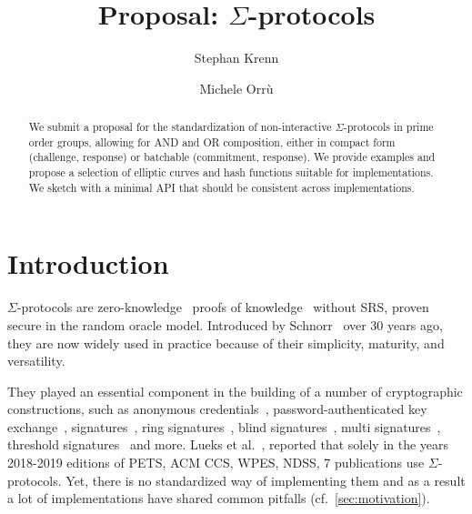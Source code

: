 \documentclass[runningheads]{llncs}
\newif\ifanonymous
\begin{document}
\title{Proposal: $\Sigma$-protocols}
%

\ifanonymous
\author{}
\institute{}
\else
\author{Stephan Krenn \and
        Michele Orr\`u}

\fi
%
\maketitle              %
%
\begin{abstract}
  We submit a proposal for the standardization of non-interactive $\Sigma$-protocols in prime order groups, allowing for AND and OR composition, either in compact form (challenge, response) or batchable (commitment, response). We provide examples and propose a selection of elliptic curves and hash functions suitable for implementations. We sketch with a minimal API that should be consistent across implementations.

\end{abstract}

\section{Introduction}
$\Sigma$-protocols are zero-knowledge~\cite{GolMicRac89} proofs of knowledge~\cite{C:BelGol92} without SRS, proven secure in the random oracle model.
Introduced by Schnorr~\cite{JC:Schnorr91} over 30 years ago, they are now widely used  in practice because of their simplicity, maturity, and versatility.

They played an essential component in the building of a number of cryptographic
constructions,
such as anonymous credentials~\cite{CCS:ChaMeiZav14}, password-authenticated key exchange~\cite{jpake}, signatures~\cite{C:Schnorr89},
ring signatures~\cite{borromeansig}, blind signatures~\cite{CCS:PoiSte97}, multi signatures~\cite{CCS:NRSW20}, threshold signatures~\cite{EPRINT:KomGol20} and more.
Lueks et al.~\cite{zksk}, reported that solely in the years 2018-2019 editions of PETS, ACM CCS, WPES, NDSS,
7 publications use  $\Sigma$-protocols.
Yet, there is no standardized way of implementing them and as a result a lot of implementations have shared common pitfalls (cf.\ \cref{sec:motivation}).
\end{document}
